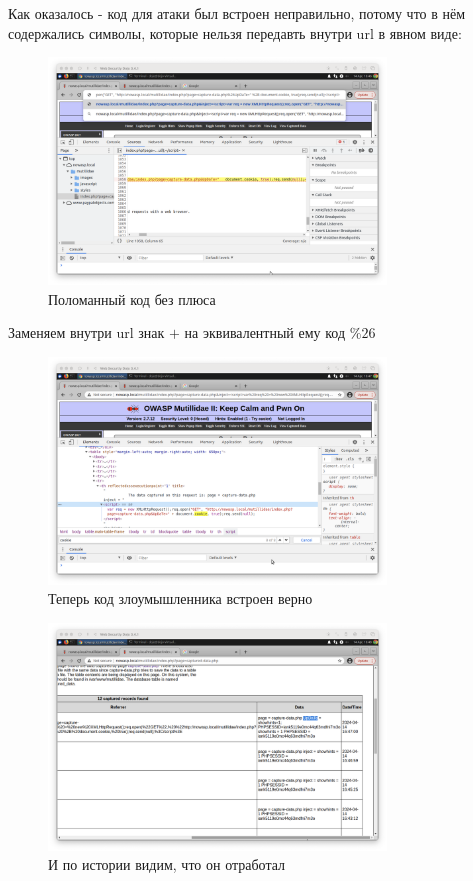 \documentclass[a4paper]{article}
\begin{document}
  Как оказалось - код для атаки был встроен неправильно, потому что в 
  нём содержались символы, которые нельзя передавть внутри url в явном виде:

  \begin{figure}[H]
    \centering
    \includegraphics[width=0.8\textwidth]{step_00029}
    \caption{Поломанный код без плюса}
  \end{figure}

  Заменяем внутри url знак $+$ на эквивалентный ему код $\%26$

  \begin{figure}[H]
    \centering
    \includegraphics[width=0.8\textwidth]{step_00030}
    \caption{Теперь код злоумышленника встроен верно}
  \end{figure}

  \begin{figure}[H]
    \centering
    \includegraphics[width=0.8\textwidth]{step_00031}
    \caption{И по истории видим, что он отработал}
  \end{figure}
\end{document}
